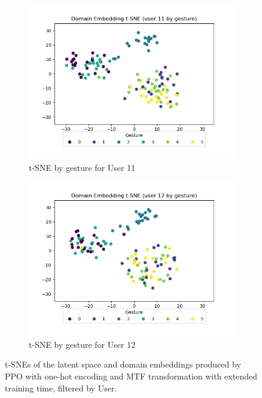 \begin{figure}[b]
\begin{subfigure}{0.3\textwidth}
		\includegraphics[width=\textwidth]{figures/extended/long_de_u11}
		\caption{t-SNE by gesture for User 11}
	\end{subfigure}
	\hfill
	\begin{subfigure}{0.3\textwidth}
		\centering
		\includegraphics[width=\textwidth]{figures/extended/long_de_u12}
		\caption{t-SNE by gesture for User 12}
	\end{subfigure}
	\hfill
	\caption{t-SNEs of the latent space and domain embeddings produced by PPO with one-hot encoding and MTF transformation with extended training time, filtered by User.}
\end{figure}